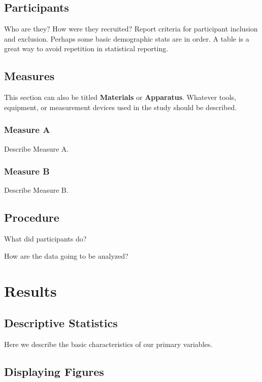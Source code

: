 \documentclass[
  man,
  floatsintext,
  longtable,
  nolmodern,
  notxfonts,
  notimes,
  mask,
  colorlinks=true,linkcolor=blue,citecolor=blue,urlcolor=blue]{apa7}
\begin{document}
\subsection{Participants}\label{participants}

Who are they? How were they recruited? Report criteria for participant
inclusion and exclusion. Perhaps some basic demographic stats are in
order. A table is a great way to avoid repetition in statistical
reporting.

\subsection{Measures}\label{measures}

This section can also be titled \textbf{Materials} or
\textbf{Apparatus}. Whatever tools, equipment, or measurement devices
used in the study should be described.

\subsubsection{Measure A}\label{measure-a}

Describe Measure A.

\subsubsection{Measure B}\label{measure-b}

Describe Measure B.

\subsection{Procedure}\label{procedure}

What did participants do?

How are the data going to be analyzed?

\section{Results}\label{results}

\subsection{Descriptive Statistics}\label{descriptive-statistics}

Here we describe the basic characteristics of our primary variables.

\subsection{Displaying Figures}\label{displaying-figures}
\end{document}
